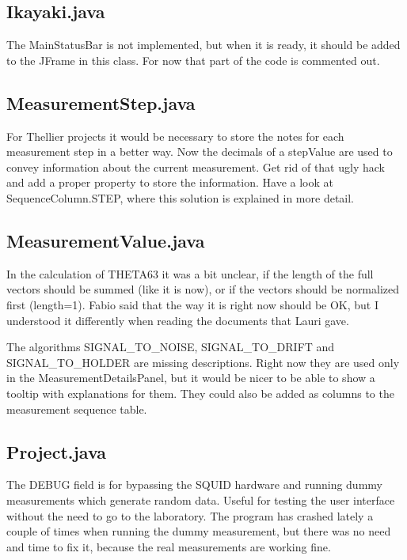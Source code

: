 \subsection{Ikayaki.java}

The MainStatusBar is not implemented, but when it is ready, it should be added to the JFrame in this class. For now that part of the code is commented out.


\subsection{MeasurementStep.java}

For Thellier projects it would be necessary to store the notes for each measurement step in a better way. Now the decimals of a stepValue are used to convey information about the current measurement. Get rid of that ugly hack and add a proper property to store the information. Have a look at SequenceColumn.STEP, where this solution is explained in more detail.


\subsection{MeasurementValue.java}

In the calculation of THETA63 it was a bit unclear, if the length of the full vectors should be summed (like it is now), or if the vectors should be normalized first (length=1). Fabio said that the way it is right now should be OK, but I understood it differently when reading the documents that Lauri gave.

The algorithms SIGNAL\_TO\_NOISE, SIGNAL\_TO\_DRIFT and SIGNAL\_TO\_HOLDER are missing descriptions. Right now they are used only in the MeasurementDetailsPanel, but it would be nicer to be able to show a tooltip with explanations for them. They could also be added as columns to the measurement sequence table.


\subsection{Project.java}

The DEBUG field is for bypassing the SQUID hardware and running dummy measurements which generate random data. Useful for testing the user interface without the need to go to the laboratory. The program has crashed lately a couple of times when running the dummy measurement, but there was no need and time to fix it, because the real measurements are working fine.


